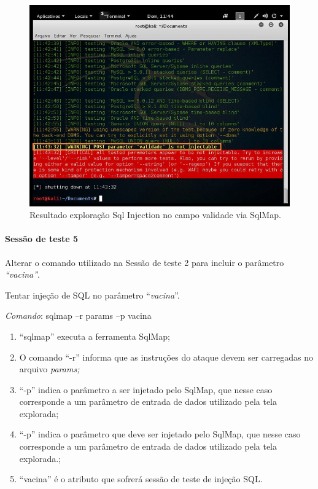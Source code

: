 \documentclass[
    12pt,               %
    openright,          %
    oneside,            %
    a4paper,            %
    section=TITLE,     %
    english,            %
    french,             %
    spanish,            %
    brazil              %
    ]{abntex2}
\begin{document}
\begin{figure}[htp]
\centering
\caption{Resultado exploração Sql Injection no campo validade via SqlMap.}
\includegraphics[width=447px]{image19.jpeg}
\end{figure}
\ifdefined\FloatBarrier \FloatBarrier \fi



\paragraph*{Sessão de teste 5}

Alterar o comando utilizado na Sessão de teste 2 para incluir o parâmetro \emph{\textquotedblleft{}vacina\textquotedblright{}}.


Tentar injeção de SQL no parâmetro \textquotedblleft{}\emph{vacina}\textquotedblright{}.


\emph{Comando}: sqlmap --r params --p vacina



\begin{enumerate}[start=1]
	
\item \textquotedblleft{}sqlmap\textquotedblright{} executa a ferramenta SqlMap;
	
\item O comando \textquotedblleft{}-r\textquotedblright{} informa que as instruções do ataque devem ser carregadas no arquivo \emph{params;}
	
\item \textquotedblleft{}-p\textquotedblright{} indica o parâmetro a ser injetado pelo SqlMap, que nesse caso corresponde a um parâmetro de entrada de dados utilizado pela tela explorada;
	
\item \textquotedblleft{}-p\textquotedblright{} indica o parâmetro que deve ser injetado pelo SqlMap, que nesse caso corresponde a um parâmetro de entrada de dados utilizado pela tela explorada.;
	
\item \textquotedblleft{}vacina\textquotedblright{} é o atributo que sofrerá sessão de teste de injeção SQL.

\end{enumerate}
\end{document}
